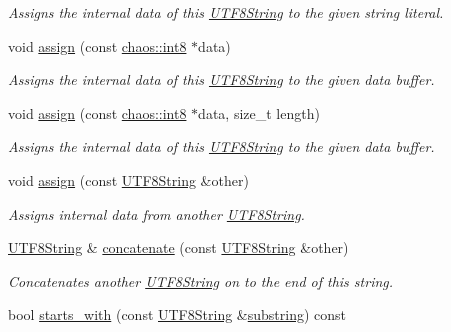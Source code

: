 \begin{DoxyCompactItemize}
\begin{DoxyCompactList}\small\item\em Assigns the internal data of this \hyperlink{classchaos_1_1str_1_1_u_t_f8_string}{U\+T\+F8\+String} to the given string literal. \end{DoxyCompactList}\item 
void \hyperlink{classchaos_1_1str_1_1_u_t_f8_string_a861874ab4bff725c9c10b20a14533221}{assign} (const \hyperlink{namespacechaos_a56015674cfe4ad1fc583c3da6c724d8a}{chaos\+::int8} $\ast$data)
\begin{DoxyCompactList}\small\item\em Assigns the internal data of this \hyperlink{classchaos_1_1str_1_1_u_t_f8_string}{U\+T\+F8\+String} to the given data buffer. \end{DoxyCompactList}\item 
void \hyperlink{classchaos_1_1str_1_1_u_t_f8_string_a399d279254a826c36ec8815122ea1883}{assign} (const \hyperlink{namespacechaos_a56015674cfe4ad1fc583c3da6c724d8a}{chaos\+::int8} $\ast$data, size\+\_\+t length)
\begin{DoxyCompactList}\small\item\em Assigns the internal data of this \hyperlink{classchaos_1_1str_1_1_u_t_f8_string}{U\+T\+F8\+String} to the given data buffer. \end{DoxyCompactList}\item 
void \hyperlink{classchaos_1_1str_1_1_u_t_f8_string_aff351b1a6276e5e59717bc6c3b67818c}{assign} (const \hyperlink{classchaos_1_1str_1_1_u_t_f8_string}{U\+T\+F8\+String} \&other)
\begin{DoxyCompactList}\small\item\em Assigns internal data from another \hyperlink{classchaos_1_1str_1_1_u_t_f8_string}{U\+T\+F8\+String}. \end{DoxyCompactList}\item 
\hyperlink{classchaos_1_1str_1_1_u_t_f8_string}{U\+T\+F8\+String} \& \hyperlink{classchaos_1_1str_1_1_u_t_f8_string_a8b61a2f73dacd4749d993dad00788d0d}{concatenate} (const \hyperlink{classchaos_1_1str_1_1_u_t_f8_string}{U\+T\+F8\+String} \&other)
\begin{DoxyCompactList}\small\item\em Concatenates another \hyperlink{classchaos_1_1str_1_1_u_t_f8_string}{U\+T\+F8\+String} on to the end of this string. \end{DoxyCompactList}\item 
\hypertarget{classchaos_1_1str_1_1_u_t_f8_string_a065a34c88630d3aca883d691322474c0}{}bool \hyperlink{classchaos_1_1str_1_1_u_t_f8_string_a065a34c88630d3aca883d691322474c0}{starts\+\_\+with} (const \hyperlink{classchaos_1_1str_1_1_u_t_f8_string}{U\+T\+F8\+String} \&\hyperlink{classchaos_1_1str_1_1_u_t_f8_string_a2d50ab58715264ae175f521816bf670c}{substring}) const \label{classchaos_1_1str_1_1_u_t_f8_string_a065a34c88630d3aca883d691322474c0}


\end{DoxyCompactItemize}
